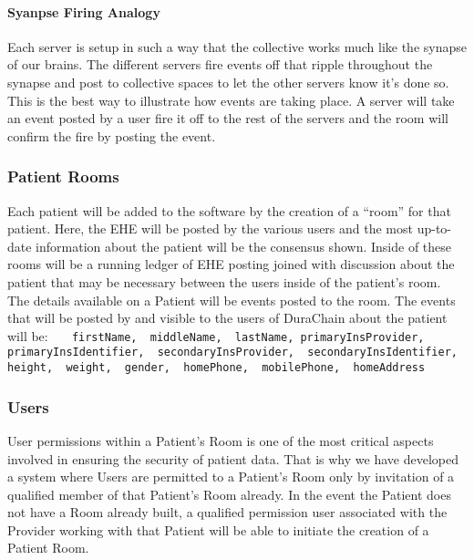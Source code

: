 \documentclass[letterpaper]{article}
\begin{document}
    \paragraph{Syanpse Firing Analogy}
    Each server is setup in such a way that the collective works much like the synapse of our brains. The different servers fire events off that ripple throughout the synapse and post to collective spaces to let the other servers know it’s done so. This is the best way to illustrate how events are taking place. A server will take an event posted by a user fire it off to the rest of the servers and the room will confirm the fire by posting the event.
%
  \subsubsection{Patient Rooms}
  Each patient will be added to the software by the creation of a “room” for that patient. Here, the EHE will be posted by the various users and the most up-to-date information about the patient will be the consensus shown. Inside of these rooms will be a running ledger of EHE posting joined with discussion about the patient that may be necessary between the users inside of the patient’s room.
%
  The details available on a Patient will be events posted to the room. The events that will be posted by and visible to the users of DuraChain about the patient will be:
%
  \texttt{
  { 
  firstName, 
  middleName, 
  lastName,
  primaryInsProvider,
  primaryInsIdentifier, 
  secondaryInsProvider, 
  secondaryInsIdentifier, 
  height, 
  weight, 
  gender, 
  homePhone, 
  mobilePhone, 
  homeAddress
  }
  }
%
  \subsubsection{Users}
  User permissions within a Patient’s Room is one of the most critical aspects involved in ensuring the security of patient data. That is why we have developed a system where Users are permitted to a Patient’s Room only by invitation of a qualified member of that Patient’s Room already. In the event the Patient does not have a Room already built, a qualified permission user associated with the Provider working with that Patient will be able to initiate the creation of a Patient Room.
%
\end{document}
